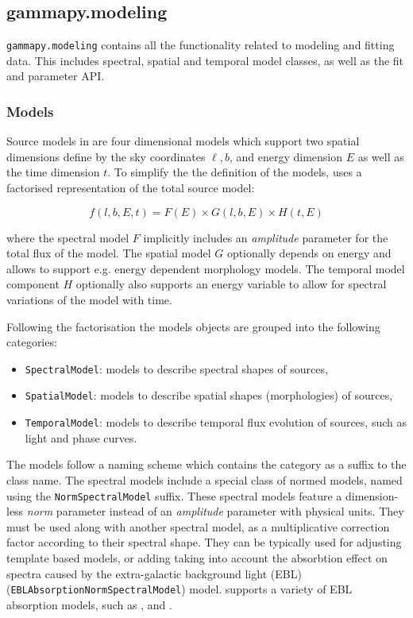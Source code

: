 \documentclass[traditabstract, longauth]{aa}
\newcommand{\code}[1]{\texttt{#1}}
\begin{document}
\subsection{gammapy.modeling}
\label{ssec:gammapy-modeling}
%
\code{gammapy.modeling} contains all the functionality related to modeling and fitting
data. This includes spectral, spatial and temporal model classes, as well as
the fit and parameter API.

\subsubsection{Models}
\label{sssec:models}
Source models in \gammapy are four dimensional models which support two
spatial dimensions define by the sky coordinates $\ell, b$, and energy dimension $E$ as well as
the time dimension $t$. To simplify the the definition of the
models, \gammapy uses a factorised representation of the total source
model:

\begin{equation}
    f(l, b, E, t) = F(E)  \times G(l, b, E) \times  H(t, E)
\end{equation}

where the spectral model $F$ implicitly includes an \textit{amplitude} parameter
for the total flux of the model. The spatial model $G$ optionally depends
on energy and allows to support e.g. energy dependent
morphology models. The temporal model component $H$
optionally also supports an energy variable to
allow for spectral variations of the model with time.

Following the factorisation the models objects are grouped
into the following categories:
\begin{itemize}
	\item \code{SpectralModel}: models to describe spectral shapes of sources,
	\item \code{SpatialModel}: models to describe spatial shapes (morphologies) of sources,
	\item \code{TemporalModel}: models to describe temporal flux evolution of sources, such as
	      light and phase curves.
\end{itemize}

The models follow a naming scheme which contains the category as a suffix to
the class name. The spectral models include a special class of normed models,
named using the \code{NormSpectralModel} suffix.
These spectral models feature a dimension-less \textit{norm} parameter
instead of an \textit{amplitude} parameter with physical units. They
must be used along with another spectral model, as a multiplicative correction
factor according to their spectral shape. They can be typically used for
adjusting template based models, or adding taking into account
the absorbtion effect on 
\gammaray spectra caused by the extra-galactic background light (EBL) (\code{EBLAbsorptionNormSpectralModel})
model. \gammapy supports a variety of EBL absorption models, such as
\cite{Franceschini2008}, \cite{Finke2010} and \cite{Dominguez2011}.
\end{document}
